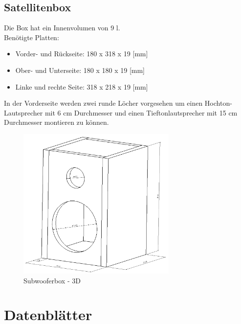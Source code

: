\subsection{Satellitenbox}
Die Box hat ein Innenvolumen von 9 l.\\
Benötigte Platten:
\begin{itemize}
	\item Vorder- und Rückseite: 180 x 318 x 19 [mm]
	\item Ober- und Unterseite: 180 x 180 x 19 [mm]
	\item Linke und rechte Seite: 318 x 218 x 19 [mm]
\end{itemize}
In der Vorderseite werden zwei runde Löcher vorgesehen um einen Hochton-Lautsprecher mit 6 cm Durchmesser und einen Tieftonlautsprecher mit 15 cm Durchmesser montieren zu können.

\begin{figure} [H]
	\centering
	\includegraphics[width=0.7\textwidth]{img/Fertigungsunterlagen/Satellitenbox.png}
	\caption{Subwooferbox - 3D}
	\label {fig:8.11.4}
\end{figure}



\newpage
\section{Datenblätter}\label{sec:8.2}
